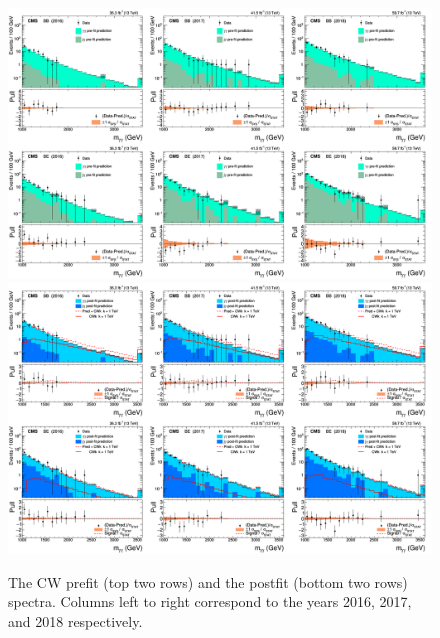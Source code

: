 \begin{figure}[!htbp]
\caption{The CW prefit (top two rows) and the postfit (bottom two rows) \mgg spectra.
Columns left to right correspond to the years 2016, 2017, and 2018 respectively. }
\centering
\includegraphics[width=1.\linewidth]{fig/PRED_PRE_CWk_real.png}
\includegraphics[width=1.\linewidth]{fig/PRED_POST_CWk_real.png}
\label{Fig:Postift_mgg_Clockwork_real}
\end{figure}

